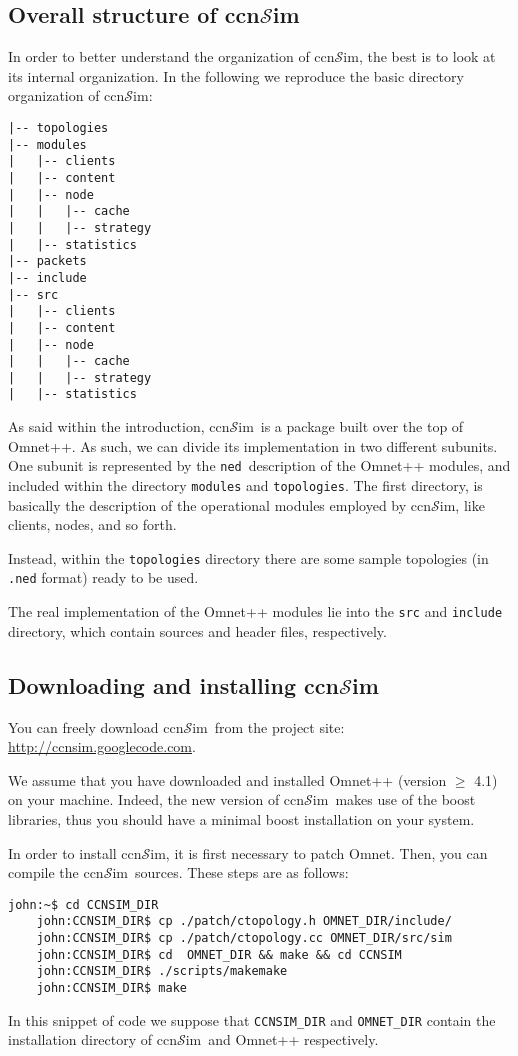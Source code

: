 \documentclass{article}
\newcommand{\ccnsim}{ccn$\mathcal{S}$im}
\newcommand{\ned}{\texttt{ned}}
\begin{document}
\subsection{Overall structure of \ccnsim}
In order to better understand the organization of \ccnsim, the best is to look at its internal organization. In the following we reproduce the basic directory organization of \ccnsim:
\begin{Verbatim}[frame=single]
|-- topologies
|-- modules
|   |-- clients
|   |-- content
|   |-- node
|   |   |-- cache
|   |   |-- strategy
|   |-- statistics
|-- packets
|-- include
|-- src
|   |-- clients
|   |-- content
|   |-- node
|   |   |-- cache
|   |   |-- strategy
|   |-- statistics
\end{Verbatim}
As said within the introduction, \ccnsim\ is a package built over the top of Omnet++. As such, we can divide its implementation in two different subunits. One subunit is represented by the \ned\ description of the Omnet++ modules, and included within the directory \verb|modules| and \verb|topologies|. The first directory, is basically the description of the operational modules employed by \ccnsim, like clients, nodes, and so forth. 

Instead, within the \verb|topologies| directory there are some sample topologies (in \verb|.ned| format) ready to be used. 

The real implementation of the Omnet++ modules lie into the \verb|src| and \verb|include| directory, which contain sources and header files, respectively.  
\subsection{Downloading and installing \ccnsim}
You can freely download \ccnsim\ from the project site: \url{http://ccnsim.googlecode.com}. 

We assume that you have downloaded and installed Omnet++ (version $\geq$ 4.1) on your machine. Indeed, the new version of \ccnsim\ makes use of the boost libraries, thus you should have a minimal boost installation on your system. 

In order to install \ccnsim, it is first necessary to patch Omnet. Then, you can compile the \ccnsim\ sources. These steps are as follows:

\begin{Verbatim}[frame=single]
    john:~$ cd CCNSIM_DIR
    john:CCNSIM_DIR$ cp ./patch/ctopology.h OMNET_DIR/include/
    john:CCNSIM_DIR$ cp ./patch/ctopology.cc OMNET_DIR/src/sim
    john:CCNSIM_DIR$ cd  OMNET_DIR && make && cd CCNSIM
    john:CCNSIM_DIR$ ./scripts/makemake
    john:CCNSIM_DIR$ make
\end{Verbatim}
In this snippet of code we suppose that \verb|CCNSIM_DIR| and \verb|OMNET_DIR| contain the installation directory of \ccnsim\ and Omnet++ respectively. 
\end{document}
